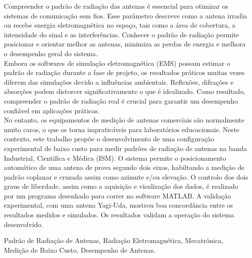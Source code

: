 
Compreender o padrão de radiação das antenas é essencial para otimizar os sistemas de comunicação sem fios. Esse parâmetro descreve como a antena irradia ou recebe energia eletromagnética no espaço, tais como a área de cobertura, a intensidade do sinal e as interferências. Conhecer o padrão de radiação permite posicionar e orientar melhor as antenas, minimiza as perdas de energia e melhora o desempenho geral do sistema.\\
Embora os softwares de simulação eletromagnética (EMS) possam estimar o padrão de radiação durante a fase de projeto, os resultados práticos muitas vezes diferem das simulações devido a influências ambientais. Reflexões, difrações e absorções podem distorcer significativamente o que é idealizado. Como resultado, compreender o padrão de radiação real é crucial para garantir um desempenho confiável em aplicações práticas.\\
No entanto, os equipamentos de medição de antenas comerciais são normalmente muito caros, o que os torna impraticáveis para laboratórios educacionais. Neste contexto, este trabalho propõe o desenvolvimento de uma configuração experimental de baixo custo para medir padrões de radiação de antenas na banda Industrial, Científica e Médica (ISM). O sistema permite o posicionamento automático de uma antena de prova segundo dois eixos, habiltando a medição de padrão coplanar e cruzada assim como azimute e/ou elevação. O controlo dos dois graus de liberdade, assim como a aquisição e visulização dos dados, é realizado por um programa desenhado para correr no software MATLAB. A validação experimental, com uma antena Yagi-Uda, mostrou boa concordância entre os resultados medidos e simulados. Os resultados validam a operação do sistema desenvolvido.



 Padrão de Radiação de Antenas, Radiação Eletromagnética, Mecatrónica, Medição de Baixo Custo, Desempenho de Antenas.


